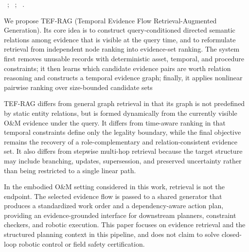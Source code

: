 ~\cite{zhang2025mrag,lau2025tarag}; ~\cite{xiong2021mdr,trivedi2023ircot}; ~\cite{sarthi2024raptor,edge2024graphrag,gutierrez2024hipporag}. 

We propose TEF-RAG (Temporal Evidence Flow Retrieval-Augmented Generation). Its core idea is to construct query-conditioned directed semantic relations among evidence that is visible at the query time, and to reformulate retrieval from independent node ranking into evidence-set ranking. The system first removes unusable records with deterministic asset, temporal, and procedure constraints; it then learns which candidate evidence pairs are worth relation reasoning and constructs a temporal evidence graph; finally, it applies nonlinear pairwise ranking over size-bounded candidate sets 

TEF-RAG differs from general graph retrieval in that its graph is not predefined by static entity relations, but is formed dynamically from the currently visible O\&M evidence under the query. It differs from time-aware ranking in that temporal constraints define only the legality boundary, while the final objective remains the recovery of a role-complementary and relation-consistent evidence set. It also differs from stepwise multi-hop retrieval because the target structure may include branching, updates, supersession, and preserved uncertainty rather than being restricted to a single linear path.

In the embodied O\&M setting considered in this work, retrieval is not the endpoint. The selected evidence flow is passed to a shared generator that produces a standardized work order and a dependency-aware action plan, providing an evidence-grounded interface for downstream planners, constraint checkers, and robotic execution. This paper focuses on evidence retrieval and the structured planning context in this pipeline, and does not claim to solve closed-loop robotic control or field safety certification.

